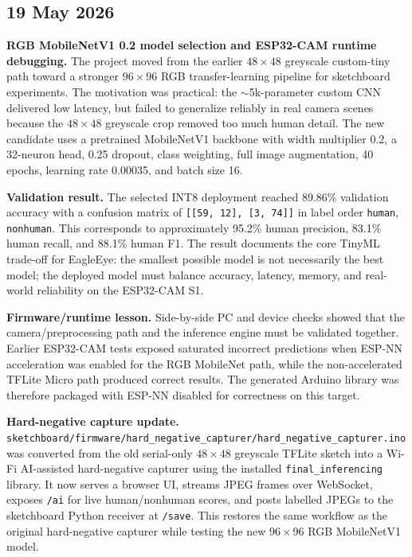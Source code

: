 \documentclass[11pt,a4paper]{article}
\begin{document}
\subsection{19 May 2026}
\textbf{RGB MobileNetV1 0.2 model selection and ESP32-CAM runtime debugging.} The project moved from the earlier $48{\times}48$ greyscale custom-tiny path toward a stronger $96{\times}96$ RGB transfer-learning pipeline for sketchboard experiments. The motivation was practical: the $\sim$5k-parameter custom CNN delivered low latency, but failed to generalize reliably in real camera scenes because the $48{\times}48$ greyscale crop removed too much human detail. The new candidate uses a pretrained MobileNetV1 backbone with width multiplier 0.2, a 32-neuron head, 0.25 dropout, class weighting, full image augmentation, 40 epochs, learning rate 0.00035, and batch size 16.

\textbf{Validation result.} The selected INT8 deployment reached 89.86\% validation accuracy with a confusion matrix of \texttt{[[59, 12], [3, 74]]} in label order \texttt{human}, \texttt{nonhuman}. This corresponds to approximately 95.2\% human precision, 83.1\% human recall, and 88.1\% human F1. The result documents the core TinyML trade-off for EagleEye: the smallest possible model is not necessarily the best model; the deployed model must balance accuracy, latency, memory, and real-world reliability on the ESP32-CAM S1.

\textbf{Firmware/runtime lesson.} Side-by-side PC and device checks showed that the camera/preprocessing path and the inference engine must be validated together. Earlier ESP32-CAM tests exposed saturated incorrect predictions when ESP-NN acceleration was enabled for the RGB MobileNet path, while the non-accelerated TFLite Micro path produced correct results. The generated Arduino library was therefore packaged with ESP-NN disabled for correctness on this target.

\textbf{Hard-negative capture update.} \texttt{sketchboard/firmware/hard\_negative\_capturer/hard\_negative\_capturer.ino} was converted from the old serial-only $48{\times}48$ greyscale TFLite sketch into a Wi-Fi AI-assisted hard-negative capturer using the installed \texttt{final\_inferencing} library. It now serves a browser UI, streams JPEG frames over WebSocket, exposes \texttt{/ai} for live human/nonhuman scores, and posts labelled JPEGs to the sketchboard Python receiver at \texttt{/save}. This restores the same workflow as the original hard-negative capturer while testing the new $96{\times}96$ RGB MobileNetV1 model.
\end{document}
